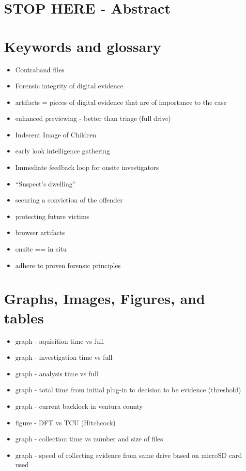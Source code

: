 \documentclass[12pt]{article}
\begin{document}
\newpage

\section{STOP HERE - Abstract}
\label{sect-StopHere}

\section{Keywords and glossary}
\begin{itemize}
  \item Contraband files
  \item Forensic integrity of digital evidence
  \item artifacts = pieces of digital evidence that are of importance to the case
  \item enhanced previewing - better than triage (full drive)
  \item Indecent Image of Children
  \item early look intelligence gathering
  \item Immediate feedback loop for onsite investigators
  \item ``Suspect's dwelling''
  \item securing a conviction of the offender
  \item protecting future victims
  \item browser artifacts
  \item onsite == in situ
  \item adhere to proven forensic principles
\end{itemize}

\section{Graphs, Images, Figures, and tables}
\begin{itemize}
  \item graph - aquisition time vs full
  \item graph - investigation time vs full
  \item graph - analysis time vs full
  \item graph - total time from initial plug-in to decision to be evidence (threshold)
  \item graph - current backlock in ventura county
  \item figure - DFT vs TCU (Hitchcock\cite{hitchcock2016tiered})
  \item graph - collection time vs number and size of files
  \item graph - speed of collecting evidence from same drive based on microSD card used

\end{itemize}
\end{document}
